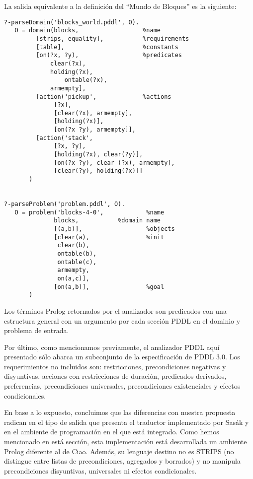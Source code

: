 \begin{ejemplo}

La salida equivalente a la definici\'on del ``Mundo de Bloques'' es la siguiente:

 \begin{verbatim}
?-parseDomain('blocks_world.pddl', O).
   O = domain(blocks,                  %name
         [strips, equality],           %requirements
         [table],                      %constants
         [on(?x, ?y),                  %predicates
	         clear(?x),
	         holding(?x),
                 ontable(?x),
	         armempty],
         [action('pickup',             %actions 
              [?x],      
              [clear(?x), armempty],
              [holding(?x)],                       
              [on(?x ?y), armempty]],
         [action('stack', 
              [?x, ?y],     
              [holding(?x), clear(?y)],
              [on(?x ?y), clear (?x), armempty],                       
              [clear(?y), holding(?x)]]
       )


?-parseProblem('problem.pddl', O).
   O = problem('blocks-4-0',            %name
              blocks,			%domain name
              [(a,b)],                  %objects
              [clear(a),                %init 
               clear(b),
               ontable(b),
               ontable(c),
               armempty, 
               on(a,c)],
              [on(a,b)],                %goal
       )
 \end{verbatim}
\end{ejemplo}

Los t\'erminos Prolog retornados por el 
analizador son predicados con una estructura general 
con un argumento por cada secci\'on PDDL en el dominio 
y problema de entrada.

Por \'ultimo, como mencionamos previamente, el analizador PDDL aqu\'i
presentado s\'olo abarca un subconjunto de la especificaci\'on
de PDDL 3.0. Los requerimientos no incluidos son:
restricciones, precondiciones negativas y disyuntivas,
acciones con restricciones de duraci\'on, predicados derivados, 
preferencias, precondiciones universales, precondiciones 
existenciales y efectos condicionales.

En base a lo expuesto, concluimos que las diferencias con nuestra
propuesta radican en el tipo de salida que presenta el traductor
implementado por Sas\'ak y en el ambiente de programaci\'on en el que
est\'a integrado. Como hemos mencionado en est\'a secci\'on, esta
implementaci\'on est\'a desarrollada un ambiente Prolog diferente
al de Ciao. Adem\'as, su lenguaje destino no es STRIPS (no distingue
entre listas de precondiciones, agregados y borrados) y no manipula 
precondiciones disyuntivas, universales ni efectos condicionales.


